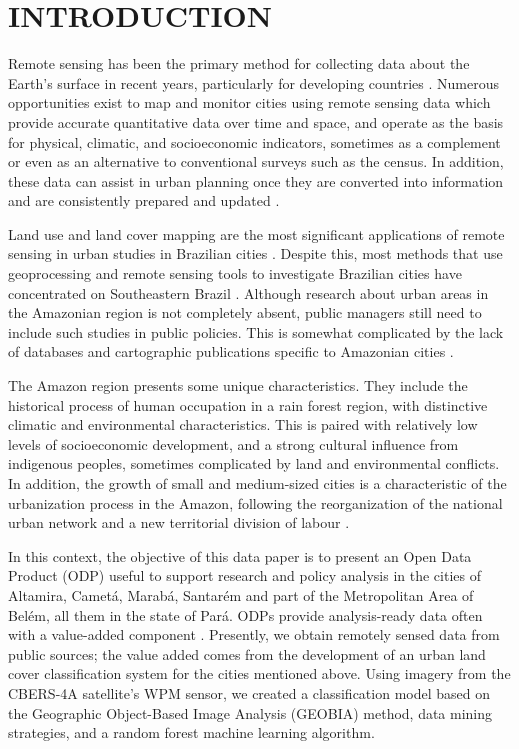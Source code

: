 \documentclass[preprint, 3p,
authoryear]{elsarticle} %
\begin{document}
\hypertarget{introduction}{%
\section{INTRODUCTION}\label{introduction}}

Remote sensing has been the primary method for collecting data about the
Earth's surface in recent years, particularly for developing countries
\citep{Zhu2022}. Numerous opportunities exist to map and monitor cities
using remote sensing data which provide accurate quantitative data over
time and space, and operate as the basis for physical, climatic, and
socioeconomic indicators, sometimes as a complement or even as an
alternative to conventional surveys such as the census. In addition,
these data can assist in urban planning once they are converted into
information and are consistently prepared and updated \citep{Weng2018}.

Land use and land cover mapping are the most significant applications of
remote sensing in urban studies in Brazilian cities \citep{Almeida2010}.
Despite this, most methods that use geoprocessing and remote sensing
tools to investigate Brazilian cities have concentrated on Southeastern
Brazil \citep{Santos2022}. Although research about urban areas in the
Amazonian region is not completely absent, public managers still need to
include such studies in public policies. This is somewhat complicated by
the lack of databases and cartographic publications specific to
Amazonian cities \citep{Cardoso2020}.

The Amazon region presents some unique characteristics. They include the
historical process of human occupation in a rain forest region, with
distinctive climatic and environmental characteristics. This is paired
with relatively low levels of socioeconomic development, and a strong
cultural influence from indigenous peoples, sometimes complicated by
land and environmental conflicts. In addition, the growth of small and
medium-sized cities is a characteristic of the urbanization process in
the Amazon, following the reorganization of the national urban network
and a new territorial division of labour
\citep{Trindade1998, Trindade2011}.

In this context, the objective of this data paper is to present an Open
Data Product (ODP) useful to support research and policy analysis in the
cities of Altamira, Cametá, Marabá, Santarém and part of the
Metropolitan Area of Belém, all them in the state of Pará. ODPs provide
analysis-ready data often with a value-added component
\citep[see][]{arribas2021open}. Presently, we obtain remotely sensed
data from public sources; the value added comes from the development of
an urban land cover classification system for the cities mentioned
above. Using imagery from the CBERS-4A satellite's WPM sensor, we
created a classification model based on the Geographic Object-Based
Image Analysis (GEOBIA) method, data mining strategies, and a random
forest machine learning algorithm.
\end{document}
